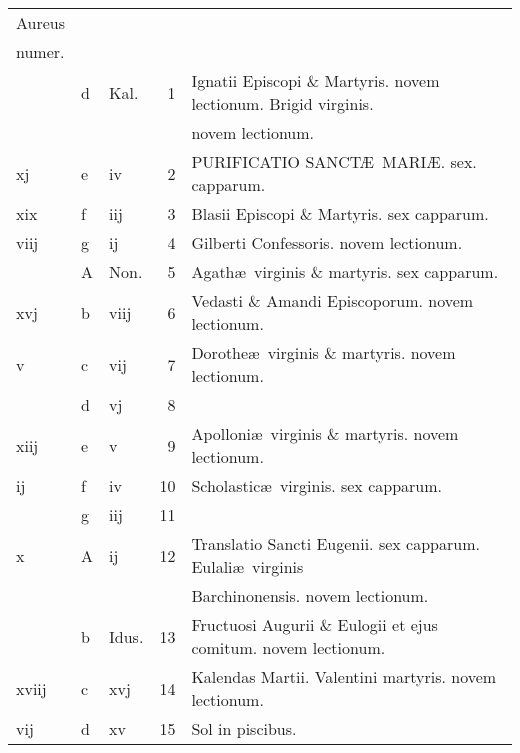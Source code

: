\documentclass[letter,11pt]{book}
\begin{document}
\begin{center}
\begin{tabular}{l | l | l | r | l}
\color{Red}Aureus & & & \\
\color{Red}numer. & & & \\
 & d & \color{Red} Kal. & 1 & Ignatii Episcopi \& Martyris. \color{Red} novem lectionum. \color{black} Brigid virginis. \\
 &  &  &  & \quad \color{Red} novem lectionum. \\%
\color{Red} xj & e & \color{Red} iv & 2 & \color{Red} PURIFICATIO SANCT\AE \ MARI\AE . \color{black} sex. capparum. \\
\color{Red} xix & f & \color{Red} iij & 3 & Blasii Episcopi \& Martyris. \color{Red} sex capparum. \\
\color{Red} viij & g & \color{Red} ij & 4 & Gilberti Confessoris. \color{Red} novem lectionum. \\
 & \color{Red} A & Non. & 5 & Agath\ae \ virginis \& martyris. \color{Red} sex capparum. \\
\color{Red} xvj & b & \color{Red} viij & 6 & Vedasti \& Amandi Episcoporum. \color{Red} novem lectionum. \\
\color{Red} v & c & \color{Red} vij & 7 & Dorothe\ae \ virginis \& martyris. \color{Red} novem lectionum. \\%
\color{Red}  & d & \color{Red} vj & 8 & \\
\color{Red} xiij & e & \color{Red} v & 9 & Apolloni\ae \ virginis \& martyris. \color{Red} novem lectionum. \\
\color{Red} ij & f & \color{Red} iv & 10 & Scholastic\ae \ virginis. \color{Red} sex capparum. \\
\color{Red}  & g & \color{Red} iij & 11 & \\
\color{Red} x & \color{Red} A & \color{Red} ij & 12 & Translatio Sancti Eugenii. \color{Red} sex capparum. \color{black} Eulali\ae \ virginis \\
 &  &  &  & Barchinonensis. \color{Red} novem lectionum. \\
\color{Red}  & b & Idus. & 13 & Fructuosi Augurii \& Eulogii et ejus comitum. \color{Red} novem lectionum. \\
\color{Red} xviij & c & \color{Red} xvj & 14 & \color{Red} Kalendas Martii. \color{black} Valentini martyris. \color{Red} novem lectionum. \\
\color{Red} vij & d & \color{Red} xv & 15 & \qquad \color{Red} Sol in piscibus. \\

\end{tabular}
\end{center}
\end{document}
